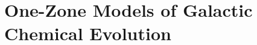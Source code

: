 \documentclass[ms.tex]{subfiles}
\begin{document}




\section{One-Zone Models of Galactic Chemical Evolution}
\label{sec:onezone}
\end{document}
